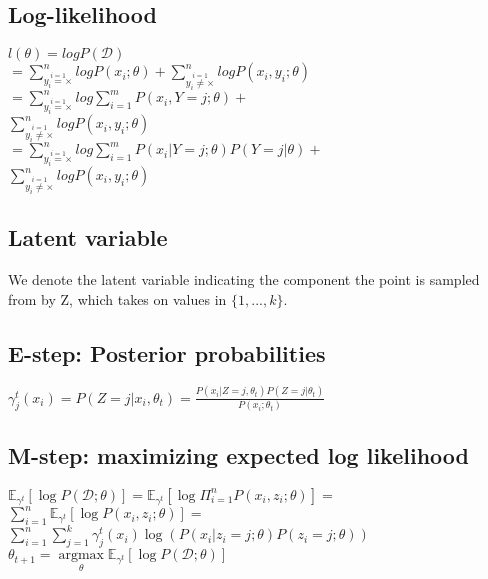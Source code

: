 \subsection*{Log-likelihood}
$l(\theta) = log P(\mathcal{D})$ \\
$=\sum_{\overset{i=1}{y_i=\times}}^n log P(x_i;\theta) + \sum_{\overset{i=1}{y_i\not=\times}}^n log P(x_i,y_i;\theta)$\\
$=\sum_{\overset{i=1}{y_i=\times}}^n log \sum_{i=1}^m P(x_i, Y=j;\theta) +$\\
$ \sum_{\overset{i=1}{y_i\not=\times}}^n log P(x_i,y_i;\theta)$\\
$=\sum_{\overset{i=1}{y_i=\times}}^n log \sum_{i=1}^m P(x_i|Y=j;\theta)P(Y=j|\theta) +$\\
$ \sum_{\overset{i=1}{y_i\not=\times}}^n log P(x_i,y_i;\theta)$

\subsection*{Latent variable}
We denote the latent variable indicating the component the point is sampled from by Z, which takes on values in $\{1,...,k\}$.

\subsection*{E-step: Posterior probabilities}
$\gamma_j^t(x_i) = P(Z=j|x_i, \theta_t) = \frac{P(x_i|Z=j, \theta_t) P(Z=j|\theta_t)}{P(x_i;\theta_t)}$

\subsection*{M-step: maximizing expected log likelihood}
$\mathbb{E}_{\gamma^t}[\log P(\mathcal{D;\theta})] = 
\mathbb{E}_{\gamma^t}[\log \Pi_{i=1}^nP(x_i,z_i;\theta)] = $ \\
$\sum_{i=1}^n \mathbb{E}_{\gamma^t}[\log P(x_i,z_i;\theta)] = $ \\
$\sum_{i=1}^n \sum_{j=1}^k \gamma_j^t(x_i) \log (P(x_i|z_i=j;\theta) P(z_i=j;\theta))$ \\
$\theta_{t+1} = \underset{\theta}{\operatorname{argmax}} \mathbb{E}_{\gamma^t}[\log P(\mathcal{D;\theta})]$